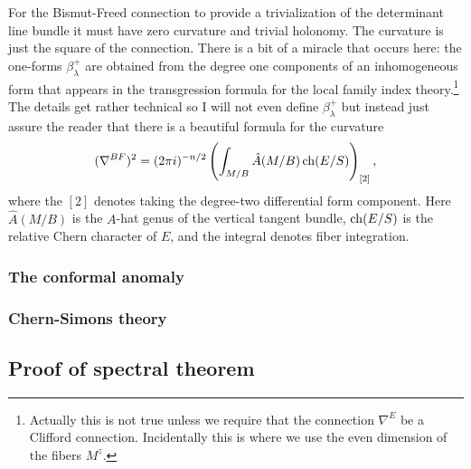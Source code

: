 \documentclass{amsart}
\begin{document}
For the Bismut-Freed connection to provide a trivialization of the determinant line bundle
it must have zero curvature and trivial holonomy. The curvature is just the square of
the connection. There is a bit of a miracle that occurs here: the one-forms $\beta_\lambda^+$
are obtained
from the degree one components of an inhomogeneous form that appears in the transgression
formula for the local family index theory.\footnote{Actually this is not true
unless we require that the connection $\nabla^E$ be a Clifford connection. Incidentally
this is where we use the even dimension of the fibers $M^z$.}
The details get rather technical so I will not even define $\beta_\lambda^+$ but instead
just assure the reader that there is a beautiful formula for the curvature
\begin{equation*}
    (\nabla^{BF})^2 = (2\pi i)^{-n/2}\left(\int_{M/B}\hat A(M/B)\operatorname{ch}(E/S)\right)_{[2]},
\end{equation*}
where the $[2]$ denotes taking the degree-two differential form component. Here
$\hat A(M/B)$ is the $A$-hat genus of the vertical tangent bundle, $\operatorname{ch}(E/S)$
is the relative Chern character of $E$, and the integral denotes fiber integration.


\subsubsection{The conformal anomaly}

\subsubsection{Chern-Simons theory}


\subsection{Proof of spectral theorem}




\end{document}
